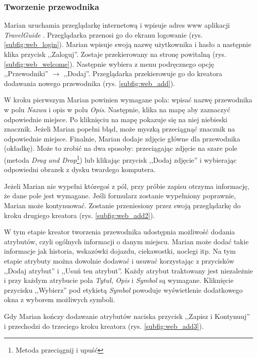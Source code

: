 \documentclass{book}
\newcommand{\appName}{\emph{TravelGuide} }
\begin{document}
			\subsubsection{Tworzenie przewodnika}
			
			Marian uruchamia przeglądarkę internetową i wpisuje adres www aplikacji \appName. Przeglądarka przenosi go do ekranu logowanie (rys. \ref{subfig:web_login}). Marian wpisuje swoją nazwę użytkownika i hasło a następnie klika przycisk ,,Zaloguj''. Zostaje przekierowany na stronę powitalną (rys. \ref{subfig:web_welcome}). Następnie wybiera z menu podręcznego opcję ,,Przewodniki'' \ensuremath{\rightarrow} ,,Dodaj''. Przeglądarka przekierowuje go do kreatora dodawania nowego przewodnika (rys. \ref{subfig:web_add}). 
			
			W kroku pierwszym Marian powinien wymagane pola: wpisać nazwę przewodnika w polu \textit{Nazwa} i opis w polu \textit{Opis}. Następnie, klika na mapę aby zaznaczyć odpowiednie miejsce. Po kliknięciu na mapę pokazuje się na niej niebieski znacznik. Jeżeli Marian popełni błąd, może myszką przeciągnąć znacznik na odpowiednie miejsce. Finalnie, Marian dodaje zdjęcie główne dla przewodnika (okładkę). Może to zrobić na dwa sposoby: przeciągając zdjęcie na szare pole (metoda \textit{Drag and Drop}\footnote{Metoda przeciągnij i upuść}) lub klikając przycisk ,,Dodaj zdjęcie'' i wybierając odpowiedni obrazek z dysku twardego komputera. 
			
			Jeżeli Marian nie wypełni któregoś z pól, przy próbie zapisu otrzyma informację, że dane pole jest wymagane. Jeśli formularz zostanie wypełniony poprawnie, Marian może kontynuować. Zostanie przeniesiony przez swoją przeglądarkę do kroku drugiego kreatora (rys. \ref{subfig:web_add2}). 
			
			W tym etapie kreator tworzenia przewodnika udostępnia możliwość dodania atrybutów, czyli ogólnych informacji o danym miejscu. Marian może dodać takie informacje jak historia, wskazówki dojazdu, ciekawostki, noclegi itp. Na tym etapie atrybuty można dowolnie dodawać i usuwać korzystając z przycisków ,,Dodaj atrybut'' i ,,Usuń ten atrybut''. Każdy atrybut traktowany jest niezależnie i przy każdym atrybucie pola \textit{Tytuł}, \textit{Opis} i \textit{Symbol} są wymagane. Kliknięcie przycisku ,,Wybierz'' pod etykietą \textit{Symbol} powoduje wyświetlenie dodatkowego okna z wyborem możliwych symboli. 
			
			Gdy Marian kończy dodawanie atrybutów naciska przycisk ,,Zapisz i Kontynuuj'' i przechodzi do trzeciego kroku kreatora (rys. \ref{subfig:web_add3}).
			
\end{document}
